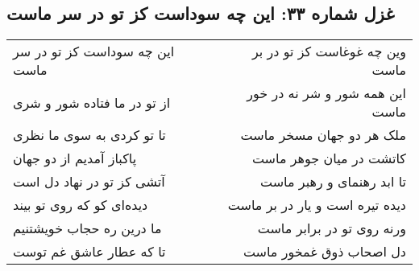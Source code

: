 \begin{center}
\section*{غزل شماره ۳۳: این چه سوداست کز تو در سر ماست}
\label{sec:033}
\begin{longtable}{l p{0.5cm} r}
این چه سوداست کز تو در سر ماست
&&
وین چه غوغاست کز تو در بر ماست
\\
از تو در ما فتاده شور و شری
&&
این همه شور و شر نه در خور ماست
\\
تا تو کردی به سوی ما نظری
&&
ملک هر دو جهان مسخر ماست
\\
پاکباز آمدیم از دو جهان
&&
کاتشت در میان جوهر ماست
\\
آتشی کز تو در نهاد دل است
&&
تا ابد رهنمای و رهبر ماست
\\
دیده‌ای کو که روی تو بیند
&&
دیده تیره است و یار در بر ماست
\\
ما درین ره حجاب خویشتنیم
&&
ورنه روی تو در برابر ماست
\\
تا که عطار عاشق غم توست
&&
دل اصحاب ذوق غمخور ماست
\\
\end{longtable}
\end{center}
